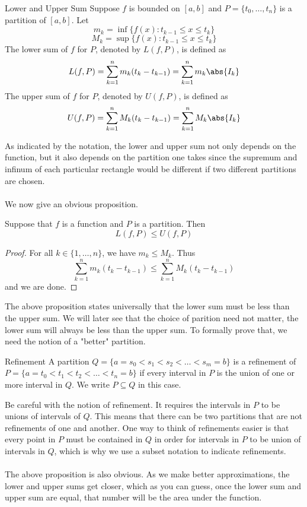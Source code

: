 \begin{defn}{Lower and Upper Sum}{} Suppose $f$ is bounded on $[a,b]$ and $P=\{t_0,\dots,t_n\}$ is a partition of $[a,b]$. Let $$m_k=\inf\{f(x):t_{k-1}\leq x\leq t_k\}$$ $$M_k=\sup\{f(x):t_{k-1}\leq x\leq t_k\}$$ The lower sum of $f$ for $P$, denoted by $L(f,P)$, is defined as $$L(f,P)=\sum_{k=1}^nm_k(t_k-t_{k-1})=\sum_{k=1}^nm_k\abs{I_k}$$ The upper sum of $f$ for $P$, denoted by $U(f,P)$, is defined as $$U(f,P)=\sum_{k=1}^nM_k(t_k-t_{k-1})=\sum_{k=1}^nM_k\abs{I_k}$$
\end{defn}

As indicated by the notation, the lower and upper sum not only depends on the function, but it also depends on the partition one takes since the supremum and infinum of each particular rectangle would be different if two different partitions are chosen. \\~\\
We now give an obvious proposition. 

\begin{prp}{}{} Suppose that $f$ is a function and $P$ is a partition. Then $$L(f,P)\leq U(f,P)$$ \tcbline
\begin{proof} For all $k\in\{1,\dots,n\}$, we have $m_k\leq M_k$. Thus $$\sum_{k=1}^nm_k(t_k-t_{k-1})\leq\sum_{k=1}^nM_k(t_k-t_{k-1})$$ and we are done. 
\end{proof}
\end{prp}

The above proposition states universally that the lower sum must be less than the upper sum. We will later see that the choice of parition need not matter, the lower sum will always be less than the upper sum. To formally prove that, we need the notion of a "better" partition. 

\begin{defn}{Refinement}{} A partition $Q=\{a=s_0<s_1<s_2<\dots<s_m=b\}$ is a refinement of $P=\{a=t_0<t_1<t_2<\dots<t_n=b\}$ if every interval in $P$ is the union of one or more interval in $Q$. We write $P\subseteq Q$ in this case. 
\end{defn}

Be careful with the notion of refinement. It requires the intervals in $P$ to be unions of intervals of $Q$. This means that there can be two partitions that are not refinements of one and another. One way to think of refinements easier is that every point in $P$ must be contained in $Q$ in order for intervals in $P$ to be union of intervals in $Q$, which is why we use a subset notation to indicate refinements. \\~\\
The above proposition is also obvious. As we make better approximations, the lower and upper sums get closer, which as you can guess, once the lower sum and upper sum are equal, that number will be the area under the function. 

